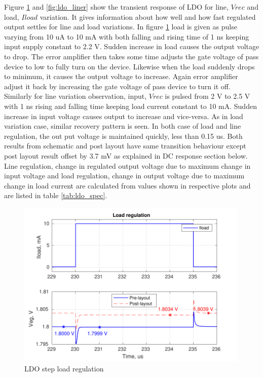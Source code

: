 \documentclass[12pt,a4paper,UKenglish]{report}
\begin{document}
Figure \ref{fig:ldo_loadr} and \ref{fig:ldo_liner} show the transient response of LDO for line, $Vrec$ and load, $Iload$ variation. 
It gives information about how well and how fast regulated output settles for line and load variations. In  figure \ref{fig:ldo_loadr} load is given as pulse
 varying from 10 uA to 10 mA with both falling and rising time of 1 ns keeping input supply constant to 2.2 V. Sudden increase in load causes the output voltage to drop. The error amplifier then takes some time adjusts the gate voltage of pass device to low to fully turn on the device. Likewise when the load suddenly drops to minimum, it causes the output voltage to increase. Again error amplifier adjust it back by increasing the gate voltage of pass device to turn it off. Similarly for line variation 
 observation, input, $Vrec$ is pulsed from 2 V to 2.5 V with 1 ns rising and falling time keeping load current constant to 10 mA. Sudden increase in input voltage causes output to increase and vice-versa. As in load variation case, similar recovery pattern is seen. In both case of load and line regulation, the out put voltage is maintained 
 quickly, less than 0.15 us. Both results from schematic and post layout have same transition behaviour except post layout result offset by 3.7 mV as explained in DC response section below. \\
 
 Line regulation, change in regulated output voltage due to maximum change in input voltage and load regulation, change in output voltage due to maximum change in load current are calculated from values shown in respective plots and are listed in table \ref{tab:ldo_spec}.

\begin{figure}[!htb] %
   \centering
   \includegraphics[width=0.99\textwidth]{img/ldo_loadr_both.pdf} 
   \caption{LDO step load regulation}
   \label{fig:ldo_loadr}
\end{figure}
\end{document}
